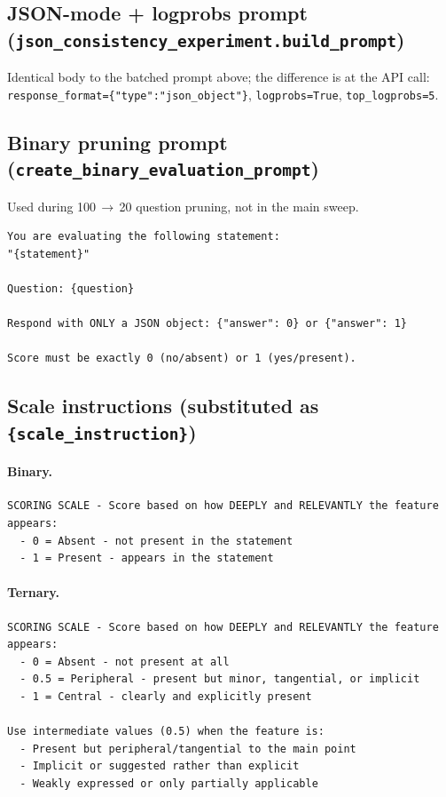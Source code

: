 \documentclass[11pt]{article}
\begin{document}
\subsection{JSON-mode + logprobs prompt (\texttt{json\_consistency\_experiment.build\_prompt})}
Identical body to the batched prompt above; the difference is at the API call: \texttt{response\_format=\{"type":"json\_object"\}}, \texttt{logprobs=True}, \texttt{top\_logprobs=5}.

\subsection{Binary pruning prompt (\texttt{create\_binary\_evaluation\_prompt})}
Used during 100\,$\rightarrow$\,20 question pruning, not in the main sweep.
\begin{verbatim}
You are evaluating the following statement:
"{statement}"

Question: {question}

Respond with ONLY a JSON object: {"answer": 0} or {"answer": 1}

Score must be exactly 0 (no/absent) or 1 (yes/present).
\end{verbatim}

\subsection{Scale instructions (substituted as \texttt{\{scale\_instruction\}})}

\paragraph{Binary.}
\begin{verbatim}
SCORING SCALE - Score based on how DEEPLY and RELEVANTLY the feature appears:
  - 0 = Absent - not present in the statement
  - 1 = Present - appears in the statement
\end{verbatim}

\paragraph{Ternary.}
\begin{verbatim}
SCORING SCALE - Score based on how DEEPLY and RELEVANTLY the feature appears:
  - 0 = Absent - not present at all
  - 0.5 = Peripheral - present but minor, tangential, or implicit
  - 1 = Central - clearly and explicitly present

Use intermediate values (0.5) when the feature is:
  - Present but peripheral/tangential to the main point
  - Implicit or suggested rather than explicit
  - Weakly expressed or only partially applicable
\end{verbatim}
\end{document}
